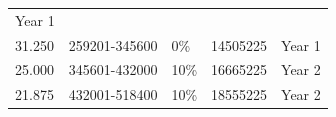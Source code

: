 \documentclass[11pt,a4paperpaper,]{report}
\begin{document}
\begin{longtable}[]{@{}llllc@{}}
\begin{minipage}[t]{0.16\columnwidth}
Year 1\strut
\end{minipage}\tabularnewline
\begin{minipage}[t]{0.12\columnwidth}\raggedright\strut
31.250\strut
\end{minipage} & \begin{minipage}[t]{0.23\columnwidth}\raggedright\strut
259201-345600\strut
\end{minipage} & \begin{minipage}[t]{0.14\columnwidth}\raggedright\strut
0\%\strut
\end{minipage} & \begin{minipage}[t]{0.19\columnwidth}\raggedright\strut
14505225\strut
\end{minipage} & \begin{minipage}[t]{0.16\columnwidth}\centering\strut
Year 1\strut
\end{minipage}\tabularnewline
\begin{minipage}[t]{0.12\columnwidth}\raggedright\strut
25.000\strut
\end{minipage} & \begin{minipage}[t]{0.23\columnwidth}\raggedright\strut
345601-432000\strut
\end{minipage} & \begin{minipage}[t]{0.14\columnwidth}\raggedright\strut
10\%\strut
\end{minipage} & \begin{minipage}[t]{0.19\columnwidth}\raggedright\strut
16665225\strut
\end{minipage} & \begin{minipage}[t]{0.16\columnwidth}\centering\strut
Year 2\strut
\end{minipage}\tabularnewline
\begin{minipage}[t]{0.12\columnwidth}\raggedright\strut
21.875\strut
\end{minipage} & \begin{minipage}[t]{0.23\columnwidth}\raggedright\strut
432001-518400\strut
\end{minipage} & \begin{minipage}[t]{0.14\columnwidth}\raggedright\strut
10\%\strut
\end{minipage} & \begin{minipage}[t]{0.19\columnwidth}\raggedright\strut
18555225\strut
\end{minipage} & \begin{minipage}[t]{0.16\columnwidth}\centering\strut
Year 2\strut
\end{minipage}\tabularnewline

\end{longtable}
\end{document}
